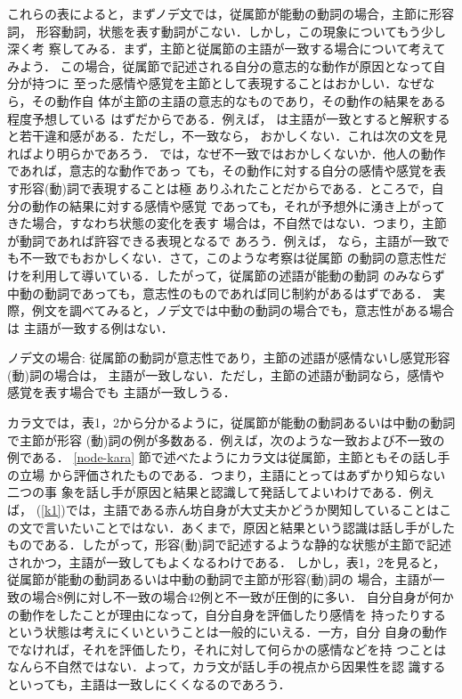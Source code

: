 これらの表によると，まずノデ文では，従属節が能動の動詞の場合，主節に形容詞，
形容動詞，状態を表す動詞がこない．しかし，この現象についてもう少し深く考
察してみる．まず，主節と従属節の主語が一致する場合について考えてみよう．
この場合，従属節で記述される自分の意志的な動作が原因となって自分が持つに
至った感情や感覚を主節として表現することはおかしい．なぜなら，その動作自
体が主節の主語の意志的なものであり，その動作の結果をある程度予想している
はずだからである．例えば，
は主語が一致とすると解釈すると若干違和感がある．ただし，不一致なら，
おかしくない．これは次の文を見ればより明らかであろう．
では，なぜ不一致ではおかしくないか．他人の動作であれば，意志的な動作であっ
ても，その動作に対する自分の感情や感覚を表す形容(動)詞で表現することは極
ありふれたことだからである．ところで，自分の動作の結果に対する感情や感覚
であっても，それが予想外に湧き上がってきた場合，すなわち状態の変化を表す
場合は，不自然ではない．つまり，主節が動詞であれば許容できる表現となるで
あろう．例えば，
なら，主語が一致でも不一致でもおかしくない．さて，このような考察は従属節
の動詞の意志性だけを利用して導いている．したがって，従属節の述語が能動の動詞
のみならず中動の動詞であっても，意志性のものであれば同じ制約があるはずである．
実際，例文を調べてみると，ノデ文では中動の動詞の場合でも，意志性がある場合は
主語が一致する例はない．

\begin{obs}\label{5}
{\dg ノデ文の場合:}
従属節の動詞が意志性であり，主節の述語が感情ないし感覚形容(動)詞の場合は，
主語が一致しない．ただし，主節の述語が動詞なら，感情や感覚を表す場合でも
主語が一致しうる．
\end{obs}

カラ文では，表1，2から分かるように，従属節が能動の動詞あるいは中動の動詞で主節が形容
(動)詞の例が多数ある．例えば，次のような一致および不一致の例である．
\ref{node-kara} 節で述べたようにカラ文は従属節，主節ともその話し手の立場
から評価されたものである．つまり，主語にとってはあずかり知らない二つの事
象を話し手が原因と結果と認識して発話してよいわけである．例えば，
(\ref{k1})では，主語である赤ん坊自身が大丈夫かどうか関知していることはこ
の文で言いたいことではない．あくまで，原因と結果という認識は話し手がした
ものである．したがって，形容(動)詞で記述するような静的な状態が主節で記述
されかつ，主語が一致してもよくなるわけである．
しかし，表1，2を見ると，従属節が能動の動詞あるいは中動の動詞で主節が形容(動)詞の
場合，主語が一致の場合8例に対し不一致の場合42例と不一致が圧倒的に多い．
自分自身が何かの動作をしたことが理由になって，自分自身を評価したり感情を
持ったりするという状態は考えにくいということは一般的にいえる．一方，自分
自身の動作でなければ，それを評価したり，それに対して何らかの感情などを持
つことはなんら不自然ではない．よって，カラ文が話し手の視点から因果性を認
識するといっても，主語は一致しにくくなるのであろう．

